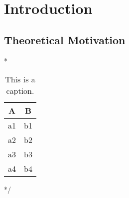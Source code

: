 \chapter{Introduction}
\label{sec:intro}

\section{Theoretical Motivation}
\label{sec:section}

\/*
\begin{table}[bt]
\begin{center}
\begin{tabular}{cc}
\hline
A & B \\
\hline
a1 & b1 \\
a2 & b2 \\
a3 & b3 \\
a4 & b4 \\
\hline
\end{tabular}
\end{center}
\caption{This is a caption.}
\label{tab:pfams}
\end{table}
*/